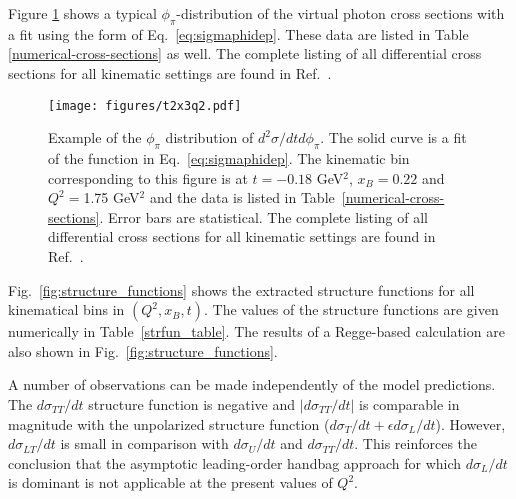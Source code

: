 \documentclass[prc,floatfix,twocolumn,superscriptaddress,letter]{revtex4}
\begin{document}
Figure \ref{fig:phi_dist} shows a typical $\phi_\pi$-distribution of the virtual photon cross sections with a fit using the form of   Eq.~\ref{eq:sigmaphidep}.  These data are listed in Table \ref{numerical-cross-sections} as well. The complete listing of all differential cross sections for all kinematic settings are found in Ref.~\cite{full_table}.

\begin{figure}
\begin{center}
\texttt{[image: figures/t2x3q2.pdf]}
\end{center}
\caption{Example  of  the $\phi_\pi$ distribution of $d^2\sigma/dtd\phi_\pi$. The solid curve is a fit of the function in Eq.~\ref{eq:sigmaphidep}.
The kinematic bin corresponding to  this figure is at $t=-0.18$ GeV$^2$, $x_B=0.22$ and $Q^2=$1.75 GeV$^2$ and the data is listed in  Table~\ref{numerical-cross-sections}. 
Error bars are  statistical. 
The complete listing of all differential cross sections for all kinematic settings are found in Ref.~\cite{full_table}.}
\label{fig:phi_dist}
\end{figure}

Fig.~\ref{fig:structure_functions}  shows the extracted structure functions for  all    kinematical bins in $(Q^2,x_B,t)$.  The values of the structure functions are given numerically in Table~\ref{strfun_table}. The results of a Regge-based calculation \cite{Laget} are also shown in Fig.~\ref{fig:structure_functions}.



 A number of observations can be made independently of the model predictions. The 
$d\sigma_{TT}/dt$ structure function is negative  and  $|d\sigma_{TT}/dt|$
 is comparable  in magnitude with the unpolarized structure function 
 ($d\sigma_T/dt+\epsilon d\sigma_L/dt$).
  However, $d\sigma_{LT}/dt$ is small in comparison with $d\sigma_U/dt$ and $d\sigma_{TT}/dt$.
  This reinforces the conclusion that the asymptotic leading-order handbag approach  for which $d\sigma_L/dt$ is dominant is not applicable at the present values of $Q^2$.
\end{document}
